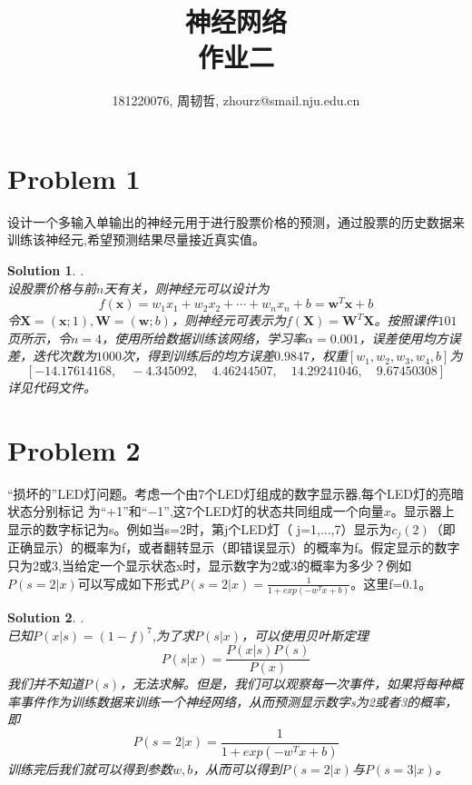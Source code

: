 \documentclass[a4paper,UTF8]{article}
\numberwithin{equation}{section}
\newtheorem*{solution}{Solution}
\begin{document}
\title{神经网络\\
作业二}
\author{181220076, 周韧哲, zhourz@smail.nju.edu.cn}
\maketitle

\section*{Problem 1}
设计一个多输入单输出的神经元用于进行股票价格的预测，通过股票的历史数据来训练该神经元,希望预测结果尽量接近真实值。
\begin{solution}.\\
	设股票价格与前$n$天有关，则神经元可以设计为$$f(\mathbf{x})=w_1x_1+w_2x_2+\cdots+w_nx_n+b=\mathbf{w}^T\mathbf{x}+b$$
	令$\mathbf{X}=(\mathbf{x};1),\mathbf{W}=(\mathbf{w};b)$，则神经元可表示为$f(\mathbf{X})=\mathbf{W}^T\mathbf{X}$。按照课件$101$页所示，令$n=4$，使用所给数据训练该网络，学习率$\alpha=0.001$，误差使用均方误差，迭代次数为$1000$次，得到训练后的均方误差$0.9847$，权重$[w_1,w_2,w_3,w_4,b]$为
	$$[-14.17614168,\quad-4.345092,\quad4.46244507,\quad14.29241046,\quad9.67450308]$$
	详见代码文件。
\end{solution}

\section*{Problem 2}
“损坏的”LED灯问题。考虑一个由7个LED灯组成的数字显示器,每个LED灯的亮暗状态分别标记
为“+1”和“−1”,这7个LED灯的状态共同组成一个向量$x$。显示器上显示的数字标记为s。例如当s=2时，第j个LED灯（
j=1,...,7）显示为$c_j(2)$（即正确显示）的概率为f，或者翻转显示（即错误显示）的概率为f。假定显示的数字只为2或3,当给定一个显示状态x时，显示数字为2或3的概率为多少？例如$P(s=2|x)$可以写成如下形式$P(s=2|x)=\frac{1}{1+exp(-w^Tx+b)}$。这里f=0.1。
\begin{solution}.\\
	已知$P(x|s)=(1-f)^7$,为了求$P(s|x)$，可以使用贝叶斯定理
	$$P(s|x)=\frac{P(x|s)P(s)}{P(x)}$$
	我们并不知道$P(s)$，无法求解。但是，我们可以观察每一次事件，如果将每种概率事件作为训练数据来训练一个神经网络，从而预测显示数字s为2或者3的概率，即$$P(s=2|x)=\frac{1}{1+exp(-w^Tx+b)}$$
	训练完后我们就可以得到参数$w,b$，从而可以得到$P(s=2|x)$与$P(s=3|x)$。
\end{solution}
\end{document}
